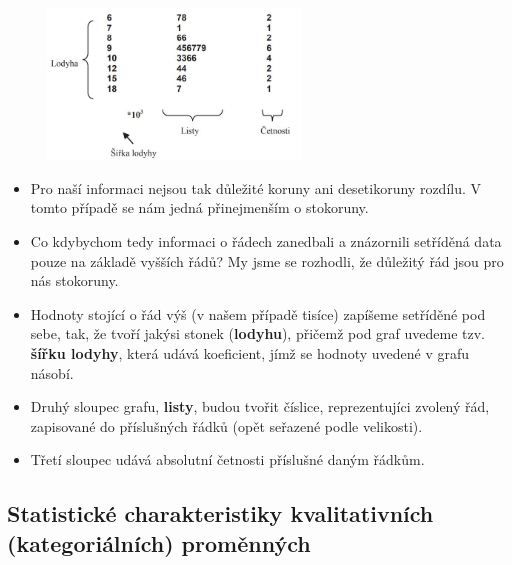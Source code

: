\begin{itemize}
\begin{itemize}
\begin{table}[H]
\begin{tabular}{|l|}
	\end{tabular}
\end{table}
				\begin{figure}[H]
				\centering
				\includegraphics[width=0.6\textwidth]{assets/13_cislicovy_hist}
				\end{figure}
		\begin{itemize}
		 \item Pro naší informaci nejsou tak důležité koruny ani desetikoruny rozdílu. V tomto případě se nám jedná přinejmenším o stokoruny.
		 \item Co kdybychom tedy informaci o  řádech zanedbali a znázornili setříděná data pouze na základě vyšších řádů? My jsme se rozhodli, že důležitý řád jsou pro nás stokoruny.
		 \item Hodnoty stojící o řád výš (v našem případě tisíce) zapíšeme setříděné pod sebe, tak, že tvoří jakýsi stonek (\textbf{lodyhu}), přičemž pod graf uvedeme tzv. \textbf{šířku lodyhy}, která udává koeficient, jímž se hodnoty uvedené v grafu násobí.
		 \item Druhý sloupec grafu, \textbf{listy}, budou tvořit číslice, reprezentujíci zvolený  řád, zapisované do příslušných řádků (opět seřazené podle velikosti).
		 \item Třetí sloupec udává absolutní četnosti příslušné daným řádkům.
		\end{itemize}
	\end{itemize}
\end{itemize}

\subsection{Statistické charakteristiky kvalitativních (kategoriálních) proměnných}
